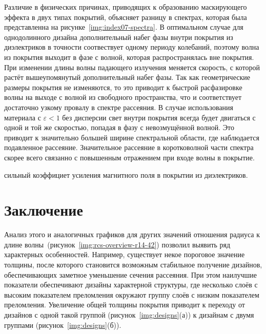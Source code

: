 Различие в физических причинах, приводящих к образованию маскирующего
эффекта в двух типах покрытий, объясняет разницу в спектрах, которая
была представленна на рисунке~\ref{img:index07-spectra}. В оптимальном
случае для однодолинного дизайна дополнительный набег фазы внутри
покрытия из диэлектриков в точности соотвествует одному периоду
колебаний, поэтому волна из покрытия выходит в фазе с волной, которая
распространялась вне покрытия. При изменении длины волны падающего
излучения меняется скорость, с которой растёт вышеупомянутый
дополнительный набег фазы. Так как геометрические размеры покрытия не
изменяются, то это приводит к быстрой расфазировке волны на выходе с
волной из свободного пространства, что и соответствует достаточно
узкому провалу в спектре рассеяния. В случае использования материала с
${\varepsilon<1}$ без дисперсии свет внутри покрытия всегда будет
двигаться с одной и той же скоростью, попадая в фазу с невозмущённой
волной. Это приводит к значительно большей ширине спектральной
области, где наблюдается подавленное рассеяние. Значительное рассеяние
в коротковолной части спектра скорее всего связанно с повышенным
отражением при входе волны в покрытие.


сильный коэффициет усиления магнитного поля в покрытии из диэлектриков.







\section{Заключение}
Анализ этого и аналогичных графиков для других значений отношения
радиуса к длине волны~(рисунок~\ref{img:rcs-overview-r14-42}) позволил
выявить ряд характерных особенностей. Например, существует некое
пороговое значение толщины, после которого становится возможным
стабильное получение дизайнов, обеспечивающих заметное уменьшение
сечения рассеяния. При этом наилучшие показатели обеспечивают дизайны
характерной структуры, где несколько слоёв с высоким показателем
преломления окружают группу слоёв с низким показателем
преломления. Увеличение общей толщины покрытия приводит к переходу от
дизайнов с одной такой группой (рисунок~\ref{img:designs}(а)) к
дизайнам с двумя группами (рисунок~\ref{img:designs}(б)).




